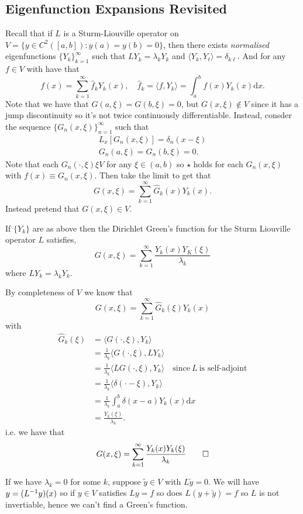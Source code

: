 \documentclass{article}
\begin{document}
\subsection{Eigenfunction Expansions Revisited}
Recall that if $ L $ is a Sturm-Liouville operator on
$ V=\{y\in C^2([a,b]): y(a)=y(b)=0\} $,
then there exists \textit{normalised} eigenfunctions $ \{Y_k\}_{k=1}^\infty $ such that $ LY_k=\lambda_kY_k $ and $ \langle Y_k,Y_\ell\rangle =\delta_{k\ell} $. And for any $ f\in V $ with have that
\[
	f(x)=\sum_{k=1}^\infty \hat f_k Y_k(x), \quad \hat f_k=\langle f,  Y_k\rangle=\int_a^b f(x)Y_k(x)\mathrm dx.\tag{$ \star $}
\]
Note that we have that $ G(a,\xi)=G(b,\xi)=0 $, but $ G(x,\xi)\notin V $ since it has a jump discontinuity so it's not twice continuously differentiable. Instead, consder the sequence $ \{G_n(x,\xi)\}_{n=1}^\infty $ such that
\begin{align*}
	L_x[G_n(x,\xi)]=\delta_n(x-\xi)\\
	G_n(a,\xi)= G_n(b,\xi)=0.
\end{align*}
Note that each $ G_n(\cdot, \xi)\xi V $ for any $ \xi\in (a,b) $ so $ \star $ holds for each $ G_n(x,\xi) $ with $ f(x)\equiv G_n(x,\xi) $. Then take the limit to get that
\[
	G(x,\xi)=\sum_{k=1}^\infty \hat G_k(x)Y_k(x).
\]
Instead pretend that $ G(x,\xi)\in V $.
\begin{proposition}
	If $ \{Y_k\} $ are as above then the Dirichlet Green's function for the Sturm Liouville operator $ L $ satisfies,
	\[
		G(x,\xi)=\sum_{k=1}^\infty \frac{Y_k(x)Y_K(\xi)}{\lambda_k}
	\]
	where $ LY_k=\lambda_k Y_k $.
\end{proposition}
By completeness of $ V $ we know that
\[
	G(x,\xi)=\sum_{k=1}^\infty \hat G_k(\xi)Y_k(x)
\]
with
\begin{align*}
	\hat G_k(\xi)&=\langle G(\cdot ,\xi),Y_k\rangle\\
		     &= \frac 1{\lambda_k}\langle G(\cdot, \xi),LY_k\rangle\\
		     &=\frac1{\lambda_k}\langle LG(\cdot, \xi), Y_k\rangle \quad\text{since}\ L\ \text{is self-adjoint}\\
		     &= \frac1{\lambda_k}\langle\delta(\cdot-\xi),Y_k\rangle\\
		     &=\frac1{\lambda_k}\int_a^b\delta(x-a)Y_k(x)\mathrm dx\\
		     &=\frac{Y_k(\xi)}{\lambda_k}.
\end{align*}
i.e. we have that
\[
	G(x,\xi)=\sum_{k=1}^\infty \frac{Y_k(x)Y_k(\xi)}{\lambda_k}\qed
\]
\begin{remark}
  If we have $ \lambda_k=0 $ for some $ k $, suppose $ \tilde y\in V $ with $ L\tilde y=0 $. We will have $ y=({L}^{-1}y)(x) $ so if $ y\in V $ satisfies $ Ly=f $ so does $ L(y+\tilde y)=f $ so $ L $ is not invertiable, hence we can't find a Green's function.
\end{remark}
\end{document}
